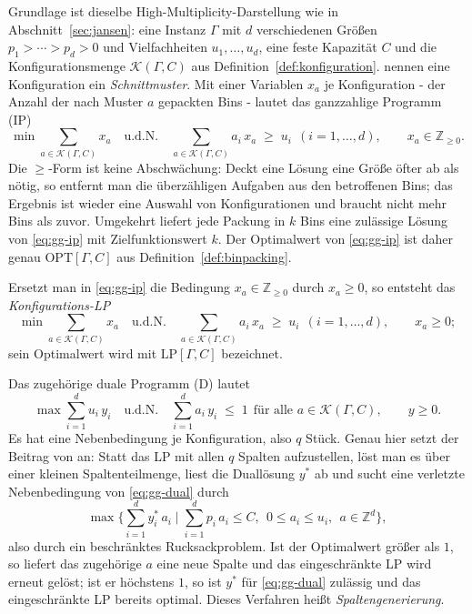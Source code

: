 Grundlage ist dieselbe High-Multiplicity-Darstellung wie in Abschnitt~\ref{sec:jansen}: eine
Instanz $\Gamma$ mit $d$ verschiedenen Größen $p_1 > \cdots > p_d > 0$ und Vielfachheiten
$u_1, \ldots, u_d$, eine feste Kapazität $C$ und die Konfigurationsmenge
$\mathcal{K}(\Gamma, C)$ aus Definition~\ref{def:konfiguration}.
\textcite{gilmore_gomory1961} nennen eine Konfiguration ein \emph{Schnittmuster}.
Mit einer Variablen $x_a$ je Konfiguration - der Anzahl der nach Muster $a$ gepackten Bins -
lautet das ganzzahlige Programm (IP)
\begin{equation}
  \min \sum_{a \in \mathcal{K}(\Gamma, C)} x_a
  \quad\text{u.d.N.}\quad
  \sum_{a \in \mathcal{K}(\Gamma, C)} a_i\, x_a \;\ge\; u_i \ \ (i = 1, \ldots, d),
  \qquad x_a \in \mathbb{Z}_{\ge 0}.
  \tag{IP}
  \label{eq:gg-ip}
\end{equation}
Die $\ge$-Form ist keine Abschwächung: Deckt eine Lösung eine Größe öfter ab als nötig, so
entfernt man die überzähligen Aufgaben aus den betroffenen Bins; das Ergebnis ist wieder eine
Auswahl von Konfigurationen und braucht nicht mehr Bins als zuvor.
Umgekehrt liefert jede Packung in $k$ Bins eine zulässige Lösung von \eqref{eq:gg-ip} mit
Zielfunktionswert $k$.
Der Optimalwert von \eqref{eq:gg-ip} ist daher genau $\mathrm{OPT}[\Gamma, C]$ aus
Definition~\ref{def:binpacking}.

\begin{definition}[Konfigurations-LP]
\label{def:gg-lp}
Ersetzt man in \eqref{eq:gg-ip} die Bedingung $x_a \in \mathbb{Z}_{\ge 0}$ durch $x_a \ge 0$, so
entsteht das \emph{Konfigurations-LP}
\begin{equation}
  \min \sum_{a \in \mathcal{K}(\Gamma, C)} x_a
  \quad\text{u.d.N.}\quad
  \sum_{a \in \mathcal{K}(\Gamma, C)} a_i\, x_a \;\ge\; u_i \ \ (i = 1, \ldots, d),
  \qquad x_a \ge 0 ;
  \tag{LP}
  \label{eq:gg-lp}
\end{equation}
sein Optimalwert wird mit $\mathrm{LP}[\Gamma, C]$ bezeichnet.
\end{definition}

Das zugehörige duale Programm (D) lautet
\begin{equation}
  \max \sum_{i=1}^{d} u_i\, y_i
  \quad\text{u.d.N.}\quad
  \sum_{i=1}^{d} a_i\, y_i \;\le\; 1 \ \ \text{für alle } a \in \mathcal{K}(\Gamma, C),
  \qquad y \ge 0 .
  \tag{D}
  \label{eq:gg-dual}
\end{equation}
Es hat eine Nebenbedingung je Konfiguration, also $q$ Stück.
Genau hier setzt der Beitrag von \textcite{gilmore_gomory1961,gilmore_gomory1963} an: Statt das LP
mit allen $q$ Spalten aufzustellen, löst man es über einer kleinen Spaltenteilmenge, liest die
Duallösung $y^\ast$ ab und sucht eine verletzte Nebenbedingung von \eqref{eq:gg-dual} durch
\[
  \max \Big\{ \textstyle\sum_{i=1}^{d} y^\ast_i\, a_i \;\Big|\;
  \sum_{i=1}^{d} p_i\, a_i \le C,\ \ 0 \le a_i \le u_i,\ \ a \in \mathbb{Z}^d \Big\},
\]
also durch ein beschränktes Rucksackproblem.
Ist der Optimalwert größer als $1$, so liefert das zugehörige $a$ eine neue Spalte und das
eingeschränkte LP wird erneut gelöst; ist er höchstens $1$, so ist $y^\ast$ für
\eqref{eq:gg-dual} zulässig und das eingeschränkte LP bereits optimal.
Dieses Verfahren heißt \emph{Spaltengenerierung}.

